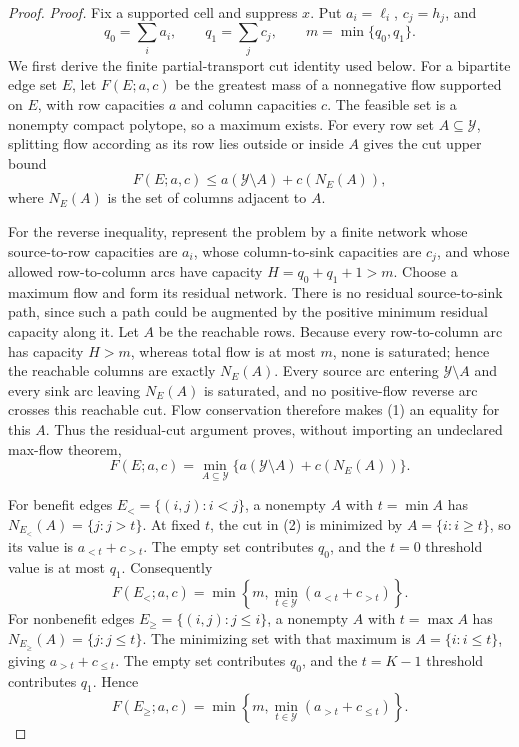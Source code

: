 \documentclass{article}
\begin{document}
\begin{proof}
\noindent\textit{Proof.}
Fix a supported cell and suppress \(x\).  Put \(a_i=\ell_i\),
\(c_j=h_j\), and
\[
q_0=\sum_i a_i,\qquad q_1=\sum_jc_j,
\qquad m=\min\{q_0,q_1\}.
\]
We first derive the finite partial-transport cut identity used below.  For
a bipartite edge set \(E\), let \(F(E;a,c)\) be the greatest mass of a
nonnegative flow supported on \(E\), with row capacities \(a\) and column
capacities \(c\).  The feasible set is a nonempty compact polytope, so a
maximum exists.  For every row set \(A\subseteq\mathcal Y\), splitting
flow according as its row lies outside or inside \(A\) gives the cut
upper bound
\[
F(E;a,c)\le a(\mathcal Y\setminus A)+c(N_E(A)),
\tag{1}
\]
where \(N_E(A)\) is the set of columns adjacent to \(A\).

For the reverse inequality, represent the problem by a finite network
whose source-to-row capacities are \(a_i\), whose column-to-sink
capacities are \(c_j\), and whose allowed row-to-column arcs have capacity
\(H=q_0+q_1+1>m\).  Choose a maximum flow and form its residual network.
There is no residual source-to-sink path, since such a path could be
augmented by the positive minimum residual capacity along it.  Let \(A\)
be the reachable rows.  Because every row-to-column arc has capacity
\(H>m\), whereas total flow is at most \(m\), none is saturated; hence
the reachable columns are exactly \(N_E(A)\).  Every source arc entering
\(\mathcal Y\setminus A\) and every sink arc leaving \(N_E(A)\) is
saturated, and no positive-flow reverse arc crosses this reachable cut.
Flow conservation therefore makes (1) an equality for this \(A\).  Thus
the residual-cut argument proves, without importing an undeclared
max-flow theorem,
\[
F(E;a,c)=\min_{A\subseteq\mathcal Y}
\{a(\mathcal Y\setminus A)+c(N_E(A))\}.
\tag{2}
\]

For benefit edges \(E_{<}=\{(i,j):i<j\}\), a nonempty \(A\) with
\(t=\min A\) has \(N_{E_<}(A)=\{j:j>t\}\).  At fixed \(t\), the cut in
(2) is minimized by \(A=\{i:i\ge t\}\), so its value is
\(a_{<t}+c_{>t}\).  The empty set contributes \(q_0\), and the
\(t=0\) threshold value is at most \(q_1\).  Consequently
\[
F(E_<;a,c)=
\min\left\{m,\min_{t\in\mathcal Y}(a_{<t}+c_{>t})\right\}.
\tag{3}
\]
For nonbenefit edges \(E_{\ge}=\{(i,j):j\le i\}\), a nonempty \(A\) with
\(t=\max A\) has \(N_{E_{\ge}}(A)=\{j:j\le t\}\).  The minimizing set
with that maximum is \(A=\{i:i\le t\}\), giving
\(a_{>t}+c_{\le t}\).  The empty set contributes \(q_0\), and the
\(t=K-1\) threshold contributes \(q_1\).  Hence
\[
F(E_{\ge};a,c)=
\min\left\{m,\min_{t\in\mathcal Y}(a_{>t}+c_{\le t})\right\}.
\tag{4}
\]


\end{proof}
\end{document}
